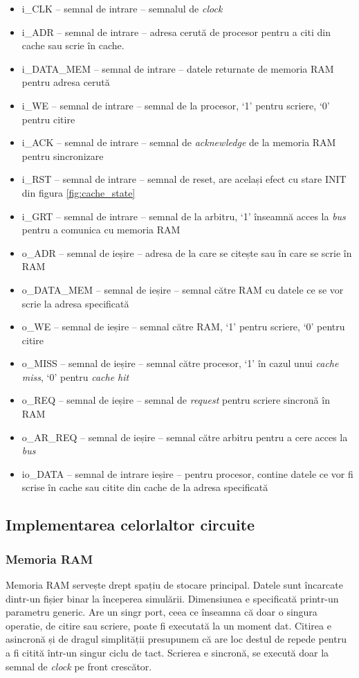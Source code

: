 \documentclass[../main.tex]{subfiles}
\begin{document}
\begin{itemize}
    \item i\_CLK -- semnal de intrare -- semnalul de \emph{clock}
    \item i\_ADR -- semnal de intrare -- adresa cerută de procesor pentru a citi din cache sau scrie în cache.
    \item i\_DATA\_MEM -- semnal de intrare -- datele returnate de memoria RAM pentru adresa cerută
    \item i\_WE -- semnal de intrare -- semnal de la procesor, `1' pentru scriere, `0' pentru citire
    \item i\_ACK -- semnal de intrare -- semnal de \emph{acknewledge} de la memoria RAM pentru sincronizare 
    \item i\_RST -- semnal de intrare -- semnal de reset, are același efect cu stare INIT din figura \ref{fig:cache_state}
    \item i\_GRT -- semnal de intrare -- semnal de la arbitru, `1' înseamnă acces la \emph{bus} pentru a comunica cu memoria RAM
    \item o\_ADR -- semnal de ieșire -- adresa de la care se citește sau în care se scrie în RAM
    \item o\_DATA\_MEM -- semnal de ieșire -- semnal către RAM cu datele ce se vor scrie la adresa specificată
    \item o\_WE -- semnal de ieșire -- semnal către RAM, `1' pentru scriere, `0' pentru citire
    \item o\_MISS -- semnal de ieșire -- semnal către procesor, `1' în cazul unui \emph{cache miss}, `0' pentru \emph{cache hit}
    \item o\_REQ -- semnal de ieșire -- semnal de \emph{request} pentru scriere sincronă în RAM
    \item o\_AR\_REQ -- semnal de ieșire -- semnal către arbitru pentru a cere acces la \emph{bus}
    \item io\_DATA -- semnal de intrare ieșire -- pentru procesor, contine datele ce vor fi scrise în cache sau citite din 
    cache de la adresa specificată
\end{itemize}

\subsection{Implementarea celorlaltor circuite}
\subsubsection{Memoria RAM}
Memoria RAM servește drept spațiu de stocare principal. Datele sunt încarcate dintr-un fișier binar la începerea
simulării. Dimensiunea e specificată printr-un parametru generic. Are un singr port, ceea ce înseamna că doar o
singura operatie, de citire sau scriere, poate fi executată la un moment dat. Citirea e asincronă și de dragul
simplității presupunem că are loc destul de repede pentru a fi citită într-un singur ciclu de tact. Scrierea
e sincronă, se execută doar la semnal de \emph{clock} pe front crescător.
\end{document}
